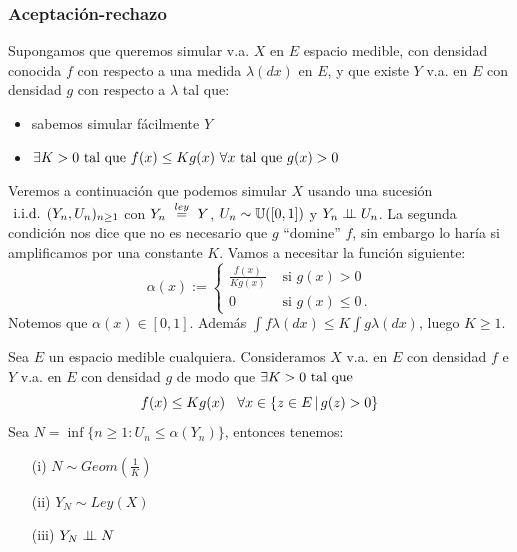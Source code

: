 \subsubsection{Aceptación-rechazo}
\label{metgen}
Supongamos que queremos simular v.a. $X$ en $E$ espacio medible, con densidad conocida $f$ con respecto a una medida $\lambda(dx)$ en $E$, y que existe $Y$ v.a. en $E$ con densidad $g$ con respecto a $\lambda$ tal que:
\begin{itemize}
    \item sabemos simular fácilmente $Y$
    \item $\exists K>0 \mbox{ tal que } f(x)\leq Kg(x)\mbox{ } \forall x \mbox{ tal que } g(x)>0$
\end{itemize}
Veremos a continuación que podemos simular $X$ usando una sucesión $\mbox{ i.i.d. } (Y_n,U_n)_{n\geq 1}$ con $Y_n\mbox{ }\overset{ley}{=}\mbox{ } Y$, $U_n\sim\mathbb{U}([0,1])$ y $Y_n\perp \!\!\! \perp U_n$. La segunda condición nos dice que no es necesario que $g$ ``domine'' $f$, sin embargo lo haría si amplificamos por una constante $K$.
\newp Vamos a necesitar la función siguiente:  %
$$ \alpha(x) := \begin{cases} 
    \displaystyle\frac{f(x)}{Kg(x)}  & \mbox{ si }g(x)>0\\
    0 & \mbox{ si }g(x)\leq0  \, .
\end{cases}$$
Notemos que $\alpha(x)\in[0,1]$. Además $\displaystyle\int f \lambda(dx)\leq K\int g\lambda(dx)$, luego $K\geq 1$.
\begin{proposition}
Sea $E$ un espacio medible cualquiera. Consideramos $X$ v.a. en $E$ con densidad $f$ e $Y$ v.a. en $E$ con densidad $g$ de modo que $\exists K>0 \mbox{ tal que } $
$$f(x)\leq Kg(x) \hspace{.25cm}\, \forall x\in \{z\in E \,|\,g(z)>0 \}$$
\newline Sea $N=\inf\{n\geq 1:U_n\leq \alpha(Y_n)\}$, entonces tenemos:
\begin{itemize}
    \item[(i)] $N\sim Geom(\frac{1}{K})$
    \item[(ii)] $Y_N\sim Ley(X)$
    \item[(iii)] $Y_N\perp \!\!\! \perp N$
\end{itemize}
\end{proposition}
